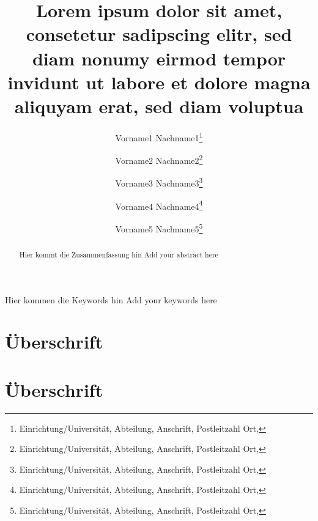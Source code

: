 \documentclass[]{lni}
\begin{document}
\author[Vorname1 Name1\and Vorname2 Name2\and Vorname3 Name3\and Vorname4 Name4\and Vorname5 Name5\and Vorname6 Name6]
{
 Vorname1 Nachname1\footnote{Einrichtung/Universität, Abteilung, Anschrift, Postleitzahl Ort, }\and
 Vorname2 Nachname2\footnote{Einrichtung/Universität, Abteilung, Anschrift, Postleitzahl Ort, }\and
 Vorname3 Nachname3\footnote{Einrichtung/Universität, Abteilung, Anschrift, Postleitzahl Ort, }\and
 Vorname4 Nachname4\footnote{Einrichtung/Universität, Abteilung, Anschrift, Postleitzahl Ort, }\and
 Vorname5 Nachname5\footnote{Einrichtung/Universität, Abteilung, Anschrift, Postleitzahl Ort, }
}
\title[Kurztitel]{Lorem ipsum dolor sit amet, consetetur sadipscing elitr, sed diam nonumy eirmod tempor invidunt ut labore et dolore magna aliquyam erat, sed diam voluptua}
\maketitle

\begin{abstract}
Hier kommt die Zusammenfassung hin
Add your abstract here
\end{abstract}
\begin{keywords}
Hier kommen die Keywords hin
Add your keywords here
\end{keywords}

\clearpage
\section{Überschrift}
\blindtext

\clearpage
\section{Überschrift}
\blindtext


\end{document}
